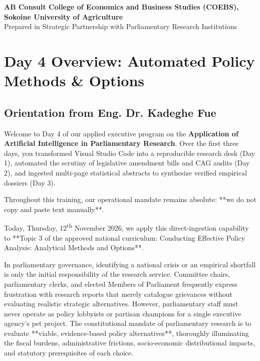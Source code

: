 \documentclass[11pt, a4paper]{report}
\begin{document}
\begin{titlepage}
    \vfill
    {\footnotesize \textbf{AB Consult \textbullet{} College of Economics and Business Studies (COEBS), Sokoine University of Agriculture}\\
    Prepared in Strategic Partnership with Parliamentary Research Institutions}
    \vspace*{0.2cm}
\end{titlepage}

\tableofcontents
\newpage

\chapter{Day 4 Overview: Automated Policy Methods \& Options}

\section{Orientation from Eng. Dr. Kadeghe Fue}
Welcome to Day 4 of our applied executive program on the \textbf{Application of Artificial Intelligence in Parliamentary Research}. Over the first three days, you transformed Visual Studio Code into a reproducible research desk (Day 1), automated the scrutiny of legislative amendment bills and CAG audits (Day 2), and ingested multi-page statistical abstracts to synthesize verified empirical dossiers (Day 3).

Throughout this training, our operational mandate remains absolute: **we do not copy and paste text manually**.

Today, Thursday, 12\textsuperscript{th} November 2026, we apply this direct-ingestion capability to **Topic 3 of the approved national curriculum: Conducting Effective Policy Analysis: Analytical Methods and Options**.

In parliamentary governance, identifying a national crisis or an empirical shortfall is only the initial responsibility of the research service. Committee chairs, parliamentary clerks, and elected Members of Parliament frequently express frustration with research reports that merely catalogue grievances without evaluating realistic strategic alternatives. However, parliamentary staff must never operate as policy lobbyists or partisan champions for a single executive agency's pet project. The constitutional mandate of parliamentary research is to evaluate **viable, evidence-based policy alternatives**, thoroughly illuminating the fiscal burdens, administrative frictions, socio-economic distributional impacts, and statutory prerequisites of each choice.
\end{document}
